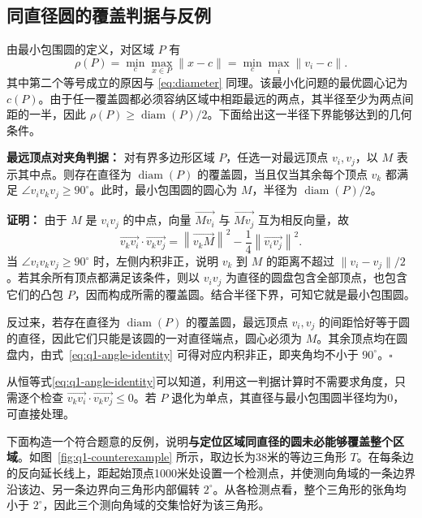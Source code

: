 \documentclass[UTF8,a4paper,zihao=-4,fontset=none]{ctexart}
\begin{document}
\subsection{同直径圆的覆盖判据与反例}

由最小包围圆的定义，对区域 \(P\) 有
\begin{equation}
  \rho(P)=\min_c\max_{x\in P}\lVert x-c\rVert
  =\min_c\max_i\lVert v_i-c\rVert .
  \label{eq:mincircle}
\end{equation}
其中第二个等号成立的原因与 \eqref{eq:diameter} 同理。该最小化问题的最优圆心记为 \(c(P)\)。由于任一覆盖圆都必须容纳区域中相距最远的两点，其半径至少为两点间距的一半，因此 \(\rho(P)\ge\operatorname{diam}(P)/2\)。下面给出这一半径下界能够达到的几何条件。

\vspace{0.5em}
\textbf{最远顶点对夹角判据：} 对有界多边形区域 \(P\)，任选一对最远顶点 \(v_i,v_j\)，以 \(M\) 表示其中点。则存在直径为 \(\operatorname{diam}(P)\) 的覆盖圆，当且仅当其余每个顶点 \(v_k\) 都满足 \(\angle v_i v_k v_j\ge90^\circ\)。此时，最小包围圆的圆心为 \(M\)，半径为 \(\operatorname{diam}(P)/2\)。

\textbf{证明：} 由于 \(M\) 是 \(v_iv_j\) 的中点，向量 \(\overrightarrow{Mv_i}\) 与 \(\overrightarrow{Mv_j}\) 互为相反向量，故
\begin{equation}
  \overrightarrow{v_kv_i}\cdot\overrightarrow{v_kv_j}
  =\left\lVert\overrightarrow{v_kM}\right\rVert^2
  -\frac14\left\lVert\overrightarrow{v_iv_j}\right\rVert^2.
  \label{eq:q1-angle-identity}
\end{equation}
当 \(\angle v_i v_k v_j\ge90^\circ\) 时，左侧内积非正，说明 \(v_k\) 到 \(M\) 的距离不超过 \(\lVert v_i-v_j\rVert/2\)。若其余所有顶点都满足该条件，则以 \(v_iv_j\) 为直径的圆盘包含全部顶点，也包含它们的凸包 \(P\)，因而构成所需的覆盖圆。结合半径下界，可知它就是最小包围圆。

反过来，若存在直径为 \(\operatorname{diam}(P)\) 的覆盖圆，最远顶点 \(v_i,v_j\) 的间距恰好等于圆的直径，因此它们只能是该圆的一对直径端点，圆心必须为 \(M\)。其余顶点均在圆盘内，由式~\eqref{eq:q1-angle-identity} 可得对应内积非正，即夹角均不小于 \(90^\circ\)。\(\square\)
\vspace{0.5em}

从恒等式\eqref{eq:q1-angle-identity}可以知道，利用这一判据计算时不需要求角度，只需逐个检查 \(\overrightarrow{v_kv_i}\cdot\overrightarrow{v_kv_j}\le0\)。若 \(P\) 退化为单点，其直径与最小包围圆半径均为0，可直接处理。

下面构造一个符合题意的反例，说明\textbf{与定位区域同直径的圆未必能够覆盖整个区域}。如图~\ref{fig:q1-counterexample} 所示，取边长为38米的等边三角形 \(T\)。在每条边的反向延长线上，距起始顶点1000米处设置一个检测点，并使测向角域的一条边界沿该边、另一条边界向三角形内部偏转 \(2^\circ\)。从各检测点看，整个三角形的张角均小于 \(2^\circ\)，因此三个测向角域的交集恰好为该三角形。
\end{document}
